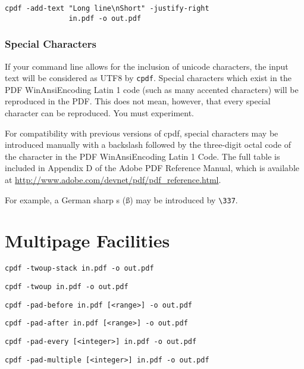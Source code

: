 \documentclass{book}
\begin{document}
\begin{framed}
  \small\begin{verbatim}cpdf -add-text "Long line\nShort" -justify-right
               in.pdf -o out.pdf\end{verbatim}
\end{framed}

\subsection{Special Characters}

If your command line allows for the inclusion of unicode characters, the input
text will be considered as UTF8 by \verb!cpdf!. Special characters which exist
in the PDF WinAnsiEncoding Latin 1 code (such as many accented characters) will
be reproduced in the PDF. This does not mean, however, that every special
character can be reproduced. You must experiment.

For compatibility with previous versions of cpdf, special characters may be
introduced manually with a backslash followed by the three-digit octal code of
the character in the PDF WinAnsiEncoding Latin 1 Code. The full table is
included in Appendix D of the Adobe PDF Reference Manual, which is available at
\url{http://www.adobe.com/devnet/pdf/pdf_reference.html}.

For example, a German sharp s (\ss) may be introduced by \verb!\337!. 

\chapter{Multipage Facilities}
  \begin{framed}
    \small\noindent\verb!cpdf -twoup-stack in.pdf -o out.pdf! 

    \vspace{1.5mm}
    \small\noindent\verb!cpdf -twoup in.pdf -o out.pdf! 

    \vspace{1.5mm}
    \small\noindent\verb!cpdf -pad-before in.pdf [<range>] -o out.pdf!

    \vspace{1.5mm}
    \small\noindent\verb!cpdf -pad-after in.pdf [<range>] -o out.pdf!

    \vspace{1.5mm}
    \small\noindent\verb!cpdf -pad-every [<integer>] in.pdf -o out.pdf!

    \vspace{1.5mm}
    \small\noindent\verb!cpdf -pad-multiple [<integer>] in.pdf -o out.pdf!
  \end{framed}
\end{document}
